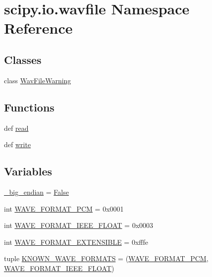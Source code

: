 \hypertarget{namespacescipy_1_1io_1_1wavfile}{}\section{scipy.\+io.\+wavfile Namespace Reference}
\label{namespacescipy_1_1io_1_1wavfile}
\subsection*{Classes}
\begin{DoxyCompactItemize}
\item 
class \hyperlink{classscipy_1_1io_1_1wavfile_1_1WavFileWarning}{Wav\+File\+Warning}
\end{DoxyCompactItemize}
\subsection*{Functions}
\begin{DoxyCompactItemize}
\item 
def \hyperlink{namespacescipy_1_1io_1_1wavfile_a18e68d4b62c5eb5ca5828a1b7d4e4d15}{read}
\item 
def \hyperlink{namespacescipy_1_1io_1_1wavfile_a6421e983f177f01d91fddc13d703c094}{write}
\end{DoxyCompactItemize}
\subsection*{Variables}
\begin{DoxyCompactItemize}
\item 
\hyperlink{namespacescipy_1_1io_1_1wavfile_a0db23481fd345a156d8206bb4c0a2bcb}{\+\_\+big\+\_\+endian} = \hyperlink{libqhull_8h_a306ebd41c0cd1303b1372c6153f0caf8}{False}
\item 
int \hyperlink{namespacescipy_1_1io_1_1wavfile_a5b0c25ef569ec977abb01d996200e311}{W\+A\+V\+E\+\_\+\+F\+O\+R\+M\+A\+T\+\_\+\+P\+C\+M} = 0x0001
\item 
int \hyperlink{namespacescipy_1_1io_1_1wavfile_a26c5fd4aa66f18206b2bd9bd62f95270}{W\+A\+V\+E\+\_\+\+F\+O\+R\+M\+A\+T\+\_\+\+I\+E\+E\+E\+\_\+\+F\+L\+O\+A\+T} = 0x0003
\item 
int \hyperlink{namespacescipy_1_1io_1_1wavfile_ad7fdc7a13591401cc2f9301a24871ab1}{W\+A\+V\+E\+\_\+\+F\+O\+R\+M\+A\+T\+\_\+\+E\+X\+T\+E\+N\+S\+I\+B\+L\+E} = 0xfffe
\item 
tuple \hyperlink{namespacescipy_1_1io_1_1wavfile_a7f4fbb31b40e00678344e94c3edd9d47}{K\+N\+O\+W\+N\+\_\+\+W\+A\+V\+E\+\_\+\+F\+O\+R\+M\+A\+T\+S} = (\hyperlink{namespacescipy_1_1io_1_1wavfile_a5b0c25ef569ec977abb01d996200e311}{W\+A\+V\+E\+\_\+\+F\+O\+R\+M\+A\+T\+\_\+\+P\+C\+M}, \hyperlink{namespacescipy_1_1io_1_1wavfile_a26c5fd4aa66f18206b2bd9bd62f95270}{W\+A\+V\+E\+\_\+\+F\+O\+R\+M\+A\+T\+\_\+\+I\+E\+E\+E\+\_\+\+F\+L\+O\+A\+T})
\end{DoxyCompactItemize}


